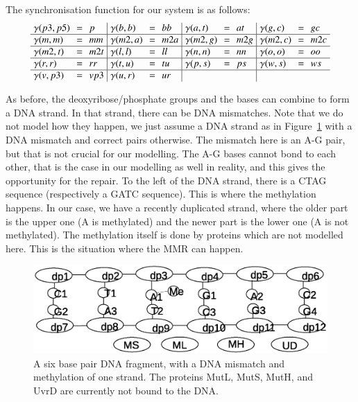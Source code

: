 \documentclass[review]{elsarticle}
\begin{document}
The synchronisation function for our system is as follows:
%
\[\arraycolsep=3.4pt\def\arraystretch{1.0}
\begin{array}{ l c l | l c l | l c l | l c l}
\gamma(p3,p5) & = & p & \gamma(b,b) & = & bb & \gamma(a,t) & = & at &  \gamma(g,c) & = & gc \\
\hline
\gamma(m,m) & = & mm & \gamma(m2,a) & = & m2a & \gamma(m2, g) & = & m2g & \gamma(m2,c) & = & m2c \\
\hline
\gamma(m2,t) & = & m2t & \gamma(l,l) & = & ll &\gamma(n,n) & = & nn & \gamma(o,o) & = & oo\\
\hline
\gamma(r,r) & = & rr & \gamma(t,u) & = & tu &\gamma(p,s) & = & ps &\gamma(w,s) & = & ws\\
\hline
\gamma(v,p3) & = & vp3 &  \gamma(u,r) & = & ur  & & & & & & \\
\end{array}
\]

As before, the deoxyribose/phosphate groups and the bases can combine to form a DNA strand. In that strand, there can be DNA mismatches. Note that we do not model how they happen, we just assume a DNA strand as in Figure~\ref{fig:state1} with a DNA mismatch and correct pairs otherwise. The mismatch here is an A-G pair, but that is not crucial for our modelling. The A-G bases cannot bond to each other, that is the case in our modelling as well in reality, and this gives the opportunity for the repair. To the left of the DNA strand, there is a CTAG sequence (respectively a GATC sequence). This is where the methylation happens. In our case, we have a recently duplicated strand, where the older part is the upper one (A is methylated) and the newer part is the lower one (A is not methylated). The methylation itself is done by proteins which are not modelled here. This is the situation where the MMR can happen.

\begin{figure}[h!]
  \centering
    \includegraphics[width=1.0\textwidth]{mmr/state1}
  \caption[A six base pair DNA fragment.]{A six base pair DNA fragment, with a DNA mismatch and methylation of one strand. The proteins MutL, MutS, MutH, and UvrD are currently not bound to the DNA.}
  \label{fig:state1}
\end{figure}
\end{document}
